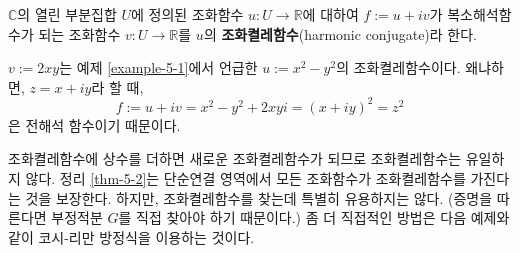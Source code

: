 \begin{saltdefinition} {}{} \label{def-5-2}
$\mathbb C$의 열린 부분집합 $U$에 정의된 조화함수 $u:U \to \mathbb R$에 대하여
$f:=u+iv$가 복소해석함수가 되는 조화함수 $v:U \to \mathbb R$를
$u$의 {\bf 조화켤레함수}(harmonic conjugate)라 한다.
\end{saltdefinition}

\begin{saltexample}[label=example-5-4]{}{}
$v:=2xy$는 예제 \ref{example-5-1}에서 언급한 $u:=x^2-y^2$의 조화켤레함수이다.
왜냐하면, $z=x+iy$라 할 때,
\[
f:= u+iv = x^2-y^2 + 2xyi = (x+iy)^2 = z^2
\]
은 전해석 함수이기 때문이다.
\end{saltexample}

조화켤레함수에 상수를 더하면 새로운 조화켤레함수가 되므로 
조화켤레함수는 유일하지 않다.
정리 \ref{thm-5-2}는 단순연결 영역에서 모든 조화함수가
조화켤레함수를 가진다는 것을 보장한다.
하지만, 조화켤레함수를 찾는데 특별히 유용하지는 않다.
(증명을 따른다면 부정적분 $G$를 직접 찾아야 하기 때문이다.)
좀 더 직접적인 방법은 다음 예제와 같이 코시-리만 방정식을 이용하는 것이다.

